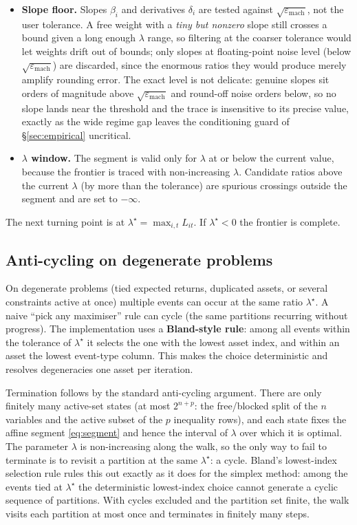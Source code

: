 \documentclass[11pt]{article}
\begin{document}
\begin{itemize}
\item \textbf{Slope floor.} Slopes $\beta_i$ and derivatives $\delta_i$ are tested
against $\sqrt{\varepsilon_{\text{mach}}}$, not the user tolerance. A free weight with a
\emph{tiny but nonzero} slope still crosses a bound given a long enough $\lambda$ range,
so filtering at the coarser tolerance would let weights drift out of bounds; only slopes
at floating-point noise level (below $\sqrt{\varepsilon_{\text{mach}}}$) are discarded,
since the enormous ratios they would produce merely amplify rounding error. The
exact level is not delicate: genuine slopes sit orders of magnitude above
$\sqrt{\varepsilon_{\text{mach}}}$ and round-off noise orders below, so no slope lands
near the threshold and the trace is insensitive to its precise value, exactly as the
wide regime gap leaves the conditioning guard of \S\ref{sec:empirical} uncritical.

\item \textbf{$\lambda$ window.} The segment is valid only for $\lambda$ at or below the
current value, because the frontier is traced with non-increasing $\lambda$. Candidate
ratios above the current $\lambda$ (by more than the tolerance) are spurious crossings
outside the segment and are set to $-\infty$.
\end{itemize}

The next turning point is at $\lambda^{\star} = \max_{i,t} L_{it}$. If
$\lambda^{\star} < 0$ the frontier is complete.

\subsection{Anti-cycling on degenerate problems}
\label{sec:bland}

On degenerate problems (tied expected returns, duplicated assets, or several
constraints active at once) multiple events can occur at the same ratio
$\lambda^{\star}$. A naive ``pick any maximiser'' rule can cycle (the same partitions
recurring without progress). The implementation uses a \textbf{Bland-style rule}: among
all events within the tolerance of $\lambda^{\star}$ it selects the one with the lowest
asset index, and within an asset the lowest event-type column. This makes the choice
deterministic and resolves degeneracies one asset per iteration.

Termination follows by the standard anti-cycling argument. There are only finitely
many active-set states (at most $2^{n+p}$: the free/blocked split of the $n$ variables
and the active subset of the $p$ inequality rows), and each state fixes the affine
segment \eqref{eq:segment} and hence the interval of $\lambda$ over which it is
optimal. The parameter $\lambda$ is non-increasing along the walk, so the only way to
fail to terminate is to revisit a partition at the same $\lambda^{\star}$: a cycle.
Bland's lowest-index selection rule rules this out exactly as it does for the simplex
method: among the events tied at $\lambda^{\star}$ the deterministic lowest-index choice
cannot generate a cyclic sequence of partitions. With cycles excluded and the partition
set finite, the walk visits each partition at most once and terminates in finitely many
steps.
\end{document}
